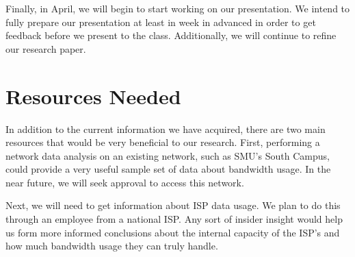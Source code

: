\documentclass{sigcomm-alternate}
\begin{document}
Finally, in April, we will begin to start working on our presentation. We intend to fully prepare our presentation at least in week in advanced in order to get feedback before we present to the class. Additionally, we will continue to refine our research paper.

		
\section{Resources Needed}
In addition to the current information we have acquired, there are two main resources that would be very beneficial to our research. First, performing a network data analysis on an existing network, such as SMU's South Campus, could provide a very useful sample set of data about bandwidth usage. In the near future, we will seek approval to access this network.

Next, we will need to get information about ISP data usage. We plan to do this through an employee from a national ISP. Any sort of insider insight would help us form more informed conclusions about the internal capacity of the ISP's and how much bandwidth usage they can truly handle.




\end{document}
